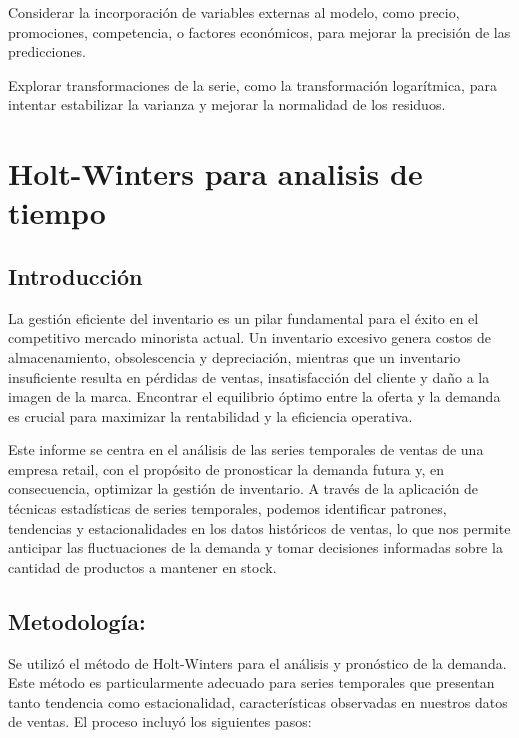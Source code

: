 \documentclass[
]{book}
\begin{document}
Considerar la incorporación de variables externas al modelo, como precio, promociones, competencia, o factores económicos, para mejorar la precisión de las predicciones.

Explorar transformaciones de la serie, como la transformación logarítmica, para intentar estabilizar la varianza y mejorar la normalidad de los residuos.

\chapter{\texorpdfstring{\textbf{Holt-Winters para analisis de tiempo}}{Holt-Winters para analisis de tiempo}}\label{holt-winters-para-analisis-de-tiempo}

\section{\texorpdfstring{\textbf{Introducción}}{Introducción}}\label{introducciuxf3n-1}

La gestión eficiente del inventario es un pilar fundamental para el éxito en el competitivo mercado minorista actual. Un inventario excesivo genera costos de almacenamiento, obsolescencia y depreciación, mientras que un inventario insuficiente resulta en pérdidas de ventas, insatisfacción del cliente y daño a la imagen de la marca. Encontrar el equilibrio óptimo entre la oferta y la demanda es crucial para maximizar la rentabilidad y la eficiencia operativa.

Este informe se centra en el análisis de las series temporales de ventas de una empresa retail, con el propósito de pronosticar la demanda futura y, en consecuencia, optimizar la gestión de inventario. A través de la aplicación de técnicas estadísticas de series temporales, podemos identificar patrones, tendencias y estacionalidades en los datos históricos de ventas, lo que nos permite anticipar las fluctuaciones de la demanda y tomar decisiones informadas sobre la cantidad de productos a mantener en stock.

\section{\texorpdfstring{\textbf{Metodología:}}{Metodología:}}\label{metodologuxeda-1}

Se utilizó el método de Holt-Winters para el análisis y pronóstico de la demanda. Este método es particularmente adecuado para series temporales que presentan tanto tendencia como estacionalidad, características observadas en nuestros datos de ventas. El proceso incluyó los siguientes pasos:
\end{document}
